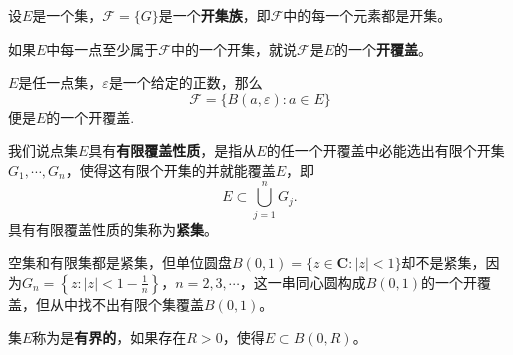 \documentclass[../../main.tex]{subfiles}
\begin{document}
\begin{definition}
设\(E\)是一个集，\(\mathscr{F} = \{ G \}\)是一个\textbf{开集族}，即\(\mathscr{F}\)中的每一个元素都是开集。

如果\(E\)中每一点至少属于\(\mathscr{F}\)中的一个开集，就说\(\mathscr{F}\)是\(E\)的一个\textbf{开覆盖}。
\end{definition}

\begin{example}
\(E\)是任一点集，\(\varepsilon\)是一个给定的正数，那么
\[
\mathscr{F} = \{ B(a, \varepsilon) : a \in E \}
\]
便是\(E\)的一个开覆盖.
\end{example}

\begin{definition}
我们说点集\(E\)具有\textbf{有限覆盖性质}，是指从\(E\)的任一个开覆盖中必能选出有限个开集\(G_1, \cdots, G_n\)，使得这有限个开集的并就能覆盖\(E\)，即
\[
E \subset \bigcup_{j = 1}^n G_j.
\]
具有有限覆盖性质的集称为\textbf{紧集}。
\end{definition}

\begin{example}
空集和有限集都是紧集，但单位圆盘\(B(0, 1) = \{ z \in \mathbf{C} : | z | < 1 \}\)却不是紧集，因为\(G_n = \left\{ z : | z | < 1 - \frac{1}{n} \right\}\)，\(n = 2, 3, \cdots\)，这一串同心圆构成\(B(0, 1)\)的一个开覆盖，但从中找不出有限个集覆盖\(B(0, 1)\)。
\end{example}

\begin{definition}
集\(E\)称为是\textbf{有界的}，如果存在\(R > 0\)，使得\(E \subset B(0, R)\)。
\end{definition}
\end{document}
